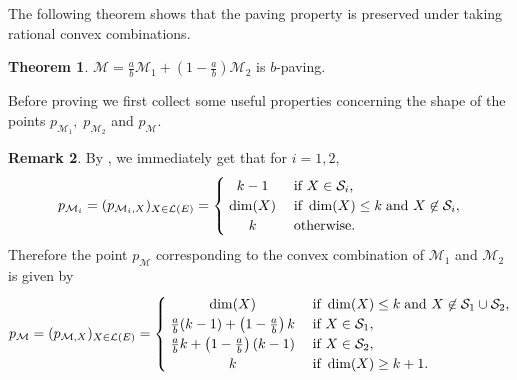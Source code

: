 \documentclass[a4paper,11pt,reqno]{amsart}
\theoremstyle{definition}
\newtheorem{theorem}{Theorem}[section]
\newtheorem{remark}[theorem]{{{Remark}}}
\newcommand{\mM}{\mathcal{M}}
\newcommand{\mL}{\mathcal{L}}
\newcommand{\mS}{\mathcal{S}}
\begin{document}
{The following theorem shows that the paving property is preserved under taking rational convex combinations.

\begin{theorem}\label{thm: mu_paving_conv_comb}
     $\mM = \frac{a}{b}\mM_1 +\left(1-\frac{a}{b}\right)\mM_2$ is $b$-paving.
\end{theorem}

Before proving  we first collect some useful properties concerning the shape of the points $p_{\mM_1}, \; p_{\mM_2}$ and $p_\mM$.

\begin{remark}\label{rem: shape_paving_points}
    By , we immediately get that for $i=1,2$,
    \[
       p_{\mM_i}=(p_{\mM_i,X})_{X\in\mL(E)}=
       \begin{cases}
        \;\hfil k-1\;&\text{if }X\in\mS_i,\\
        \;\hfil \dim(X)\;&\text{if }\dim(X)\leq k\; \textnormal{and }X\not\in\mS_i,\\
        \;\hfil k\;&\text{otherwise}. 
        \end{cases} 
    \]
    Therefore the point $p_\mM$ corresponding to the convex combination of $\mM_1$ and $\mM_2$ is given by
    \[
        p_{\mM}=(p_{\mM,X})_{X\in\mL(E)}=
       \begin{cases}
        \;\hfil \dim(X)\;&\text{if }\dim(X)\leq k\; \textnormal{and } X\not\in\mS_1\cup\mS_2,\\
        \;\hfil \frac{a}{b}(k-1)+\left(1-\frac{a}{b}\right)k\;&\text{if } X\in\mS_1,\\
        \;\hfil \frac{a}{b} k+\left(1-\frac{a}{b}\right)(k-1)\;&\text{if } X\in\mS_2,\\
        \;\hfil k\;&\text{if } \dim(X)\geq k+1. 
        \end{cases}
    \]
\end{remark}

}
\end{document}
